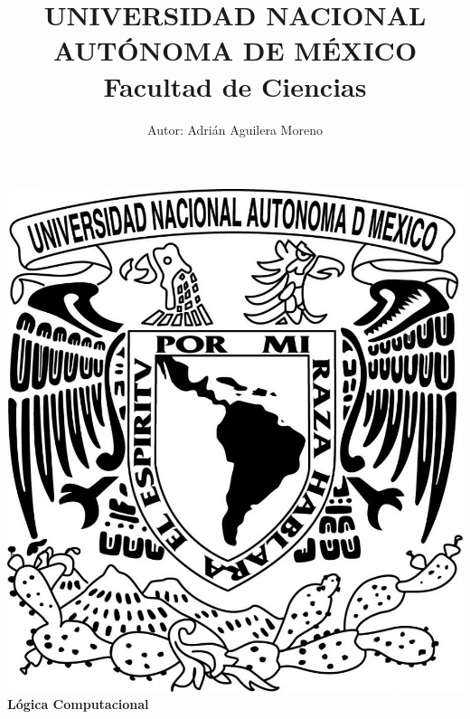 \documentclass{article}
\begin{document}
\title{UNIVERSIDAD NACIONAL AUT\'ONOMA DE M\'EXICO\\ Facultad de Ciencias}
\author{Autor: Adri\'an Aguilera Moreno}

\date{}
\maketitle
\begin{center}
  \includegraphics[scale=0.20]{../Imagen/Portada.jpg}\\[0.4cm]
  \Large
  \bf{Lógica Computacional}
  \normalsize
\end{center}
\newpage
{}
\end{document}
